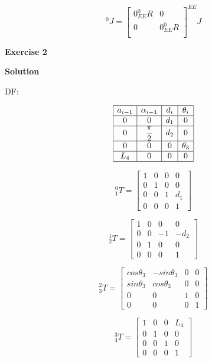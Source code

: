 \documentclass[12pt]{article}
\begin{document}
\[
^{0}J=
\left[
\begin{array}{cc}
0^0_{EE}R & 0 \\
0 & 0^0_{EE}R\\
\end{array} \right] ^{EE}J
\]

\medskip

\textbf{Exercise 2}		
		
\textbf{Solution}

DF:

\[
\begin{array}{|c|c|c|c|}
\hline
a_{i-1} & \alpha_{i-1} & d_i & \theta_i\\
\hline
0 & 0 & d_1 & 0 \\
\hline
0 & \dfrac{\pi}{2} & d_2 & 0\\
\hline
0 & 0 & 0 & \theta_3\\
\hline
L_4 & 0 & 0 & 0\\
\hline

\end{array} \]

\[^0_{1}T=\left[
\begin{array}{cccc}
1 & 0 & 0 & 0 \\
0 & 1 & 0 & 0 \\
0 & 0 & 1 & d_1\\
0 & 0 & 0 & 1
\end{array} \right]\]


\[^1_{2}T=\left[
\begin{array}{cccc}
1 & 0 & 0 & 0 \\
0 & 0 & -1 & -d_2 \\
0 & 1 & 0 & 0 \\
0 & 0 & 0 & 1
\end{array} \right]\]

\[^2_{3}T=\left[
\begin{array}{cccc}
cos\theta_3 & -sin\theta_3 & 0 & 0 \\
sin\theta_3 & cos\theta_3 & 0 & 0 \\
0 & 0 & 1 & 0 \\
0 & 0 & 0 & 1
\end{array} \right]\]

\[^3_{4}T=\left[
\begin{array}{cccc}
1 & 0 & 0 & L_4 \\
0 & 1 & 0 & 0 \\
0 & 0 & 1 & 0 \\
0 & 0 & 0 & 1
\end{array} \right]\]
\end{document}
